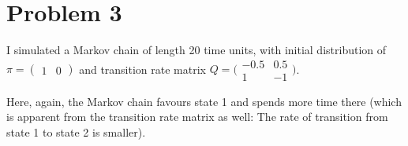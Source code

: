 \documentclass[a4paper]{article}
\begin{document}
\section*{Problem 3}
I simulated a Markov chain of length 20 time units, with initial distribution of
$\pi = (\begin{smallmatrix} 1 & 0\end{smallmatrix})$ and transition rate matrix 
$Q = \bigl(\begin{smallmatrix} -0.5 & 0.5 \\ 1 & -1\end{smallmatrix}\bigr)$.

Here, again, the Markov chain favours state 1 and spends more time there (which
is apparent from the transition rate matrix as well: The rate of transition
from state 1 to state 2 is
smaller).
\begin{figure}[ht]
    \centering
\end{figure}
\end{document}
